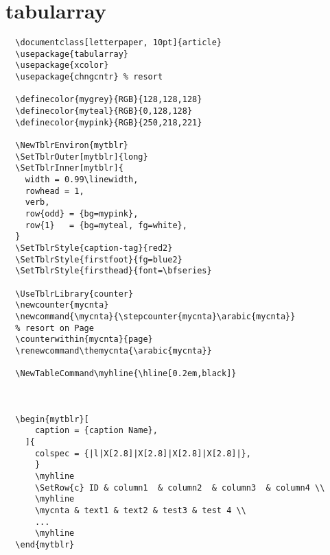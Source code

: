 \section{tabularray \textcolor{green}{} \textcolor{blue}{}  \textcolor{cyan}{} }

\begin{verbatim}
  \documentclass[letterpaper, 10pt]{article}
  \usepackage{tabularray}
  \usepackage{xcolor}
  \usepackage{chngcntr} % resort

  \definecolor{mygrey}{RGB}{128,128,128}
  \definecolor{myteal}{RGB}{0,128,128}
  \definecolor{mypink}{RGB}{250,218,221}

  \NewTblrEnviron{mytblr}
  \SetTblrOuter[mytblr]{long}
  \SetTblrInner[mytblr]{
    width = 0.99\linewidth,
    rowhead = 1,
    verb,
    row{odd} = {bg=mypink}, 
    row{1}   = {bg=myteal, fg=white},
  }
  \SetTblrStyle{caption-tag}{red2}
  \SetTblrStyle{firstfoot}{fg=blue2}
  \SetTblrStyle{firsthead}{font=\bfseries}

  \UseTblrLibrary{counter}
  \newcounter{mycnta}
  \newcommand{\mycnta}{\stepcounter{mycnta}\arabic{mycnta}}
  % resort on Page
  \counterwithin{mycnta}{page}
  \renewcommand\themycnta{\arabic{mycnta}}

  \NewTableCommand\myhline{\hline[0.2em,black]}
  
  

  \begin{mytblr}[
      caption = {caption Name},
    ]{
      colspec = {|l|X[2.8]|X[2.8]|X[2.8]|X[2.8]|},
      }
      \myhline
      \SetRow{c} ID & column1  & column2  & column3  & column4 \\
      \myhline
      \mycnta & text1 & text2 & test3 & test 4 \\
      ...
      \myhline
  \end{mytblr}

  
\end{verbatim}

\newpage
